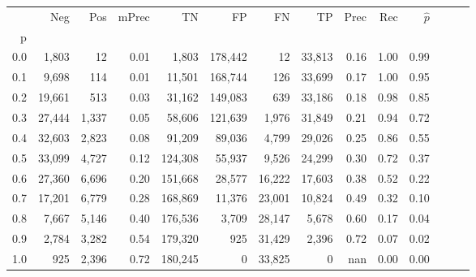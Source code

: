 \begin{tabular}{rrrrrrrrrrrrrr}
\toprule
{} &     Neg &    Pos & mPrec &       TN &       FP &      FN &      TP &  Prec &   Rec & $\hat{p}$ \\
p   &         &        &       &          &          &         &         &       &       &           \\
\midrule
0.0 &   1,803 &     12 &  0.01 &    1,803 &  178,442 &      12 &  33,813 &  0.16 &  1.00 &      0.99 \\
0.1 &   9,698 &    114 &  0.01 &   11,501 &  168,744 &     126 &  33,699 &  0.17 &  1.00 &      0.95 \\
0.2 &  19,661 &    513 &  0.03 &   31,162 &  149,083 &     639 &  33,186 &  0.18 &  0.98 &      0.85 \\
0.3 &  27,444 &  1,337 &  0.05 &   58,606 &  121,639 &   1,976 &  31,849 &  0.21 &  0.94 &      0.72 \\
0.4 &  32,603 &  2,823 &  0.08 &   91,209 &   89,036 &   4,799 &  29,026 &  0.25 &  0.86 &      0.55 \\
0.5 &  33,099 &  4,727 &  0.12 &  124,308 &   55,937 &   9,526 &  24,299 &  0.30 &  0.72 &      0.37 \\
0.6 &  27,360 &  6,696 &  0.20 &  151,668 &   28,577 &  16,222 &  17,603 &  0.38 &  0.52 &      0.22 \\
0.7 &  17,201 &  6,779 &  0.28 &  168,869 &   11,376 &  23,001 &  10,824 &  0.49 &  0.32 &      0.10 \\
0.8 &   7,667 &  5,146 &  0.40 &  176,536 &    3,709 &  28,147 &   5,678 &  0.60 &  0.17 &      0.04 \\
0.9 &   2,784 &  3,282 &  0.54 &  179,320 &      925 &  31,429 &   2,396 &  0.72 &  0.07 &      0.02 \\
1.0 &     925 &  2,396 &  0.72 &  180,245 &        0 &  33,825 &       0 &   nan &  0.00 &      0.00 \\
\bottomrule
\end{tabular}
